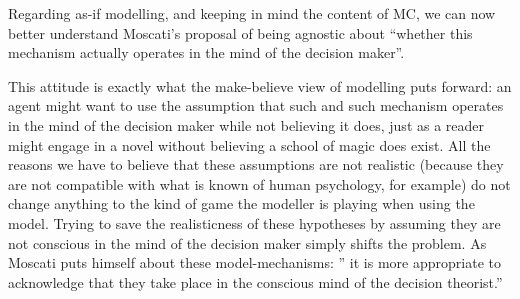 \documentclass[a4paper,11pt]{article}
\theoremstyle{definition}
\begin{document}
\color{red}{(Mettre une citation de Vaihinger ? Tu penses que ça peut être utile ?)}

Regarding as-if modelling, and keeping in mind the content of MC, we can now better understand Moscati's proposal of being agnostic about ``whether this mechanism actually operates in the mind of the decision maker''. \citep[p.~2]{Moscati2023}

This attitude is exactly what the make-believe view of modelling puts forward: an agent might want to use the assumption that such and such mechanism operates in the mind of the decision maker while not believing it does, just as a reader might engage in a novel without believing a school of magic does exist. All the reasons we have to believe that these assumptions are not realistic (because they are not compatible with what is known of human psychology, for example) do not change anything to the kind of game the modeller is playing when using the model. Trying to save the realisticness of these hypotheses by assuming they are not conscious in the mind of the decision maker simply shifts the problem. As Moscati puts himself about these model-mechanisms: '' it is more appropriate to acknowledge that they take place in the conscious mind of the decision theorist.'' \citep[p.~12]{Moscati2023}
\end{document}
